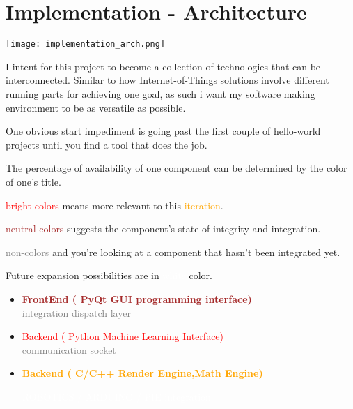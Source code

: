 


\part*{Implementation - Architecture}

  \begin{center}
    \texttt{[image: implementation\_arch.png]}
  \end{center}
  \pagebreak

  I intent for this project to become a collection of technologies that can be interconnected.
Similar to how Internet-of-Things solutions involve different running parts for achieving one goal, 
as such i want my software making environment to be as versatile as possible. 

  One obvious start impediment is going past the first couple of hello-world projects
  until you find a tool that does the job.

  The percentage of availability of one component can be determined by the color of one's title. 

    \textcolor {red} {bright  colors} means more relevant to this  \textcolor {orange} {iteration}.

    \textcolor {brown} {neutral colors} suggests the component's state of integrity and integration.

    \textcolor {gray} {non-colors} and you're looking at a component that hasn't been integrated yet.

  Future expansion possibilities are in \textcolor {white} {white} color. 


  \begin{itemize}
    \item  \textcolor {brown} { \textbf { FrontEnd ( PyQt   GUI programming interface)} } \\
    \textcolor {gray}   { integration dispatch layer  }
    \item \textcolor {red}    { Backend  ( Python Machine Learning Interface) } \\
      \textcolor {gray}   { communication socket }
    \item \textcolor {orange} { \textbf { Backend  ( C/C++  Render Engine,Math Engine) } }

    \textcolor {white}  { ROBOTICS / ARDUINO / PIE integration }
\end{itemize}



